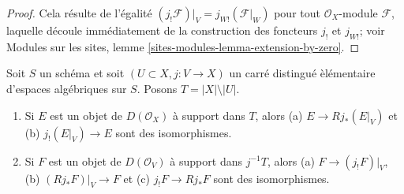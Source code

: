 \begin{proof}
Cela r\'esulte de l'\'egalit\'e
$(j_!\mathcal{F})|_V = j_{W!}(\mathcal{F}|_W)$ pour tout
$\mathcal{O}_X$-module $\mathcal{F}$, laquelle d\'ecoule imm\'ediatement de la
construction des foncteurs $j_!$ et $j_{W!}$; voir Modules sur les sites,
lemme \ref{sites-modules-lemma-extension-by-zero}.
\end{proof}

\begin{lemma}
\label{lemma-pushforward-with-support-in-open}
Soit $S$ un sch\'ema et soit $(U \subset X, j : V \to X)$ un carr\'e
distingu\'e \`el\'ementaire d'espaces alg\'ebriques sur $S$. Posons
$T = |X| \setminus |U|$.
\begin{enumerate}
\item Si $E$ est un objet de $D(\mathcal{O}_X)$ \`a support dans $T$, alors
(a) $E \to Rj_*(E|_V)$ et (b) $j_!(E|_V) \to E$ sont des isomorphismes.
\item Si $F$ est un objet de $D(\mathcal{O}_V)$ \`a support dans $j^{-1}T$,
alors (a) $F \to (j_!F)|_V$, (b) $(Rj_*F)|_V \to F$ et (c)
$j_!F \to Rj_*F$ sont des isomorphismes.
\end{enumerate}
\end{lemma}

